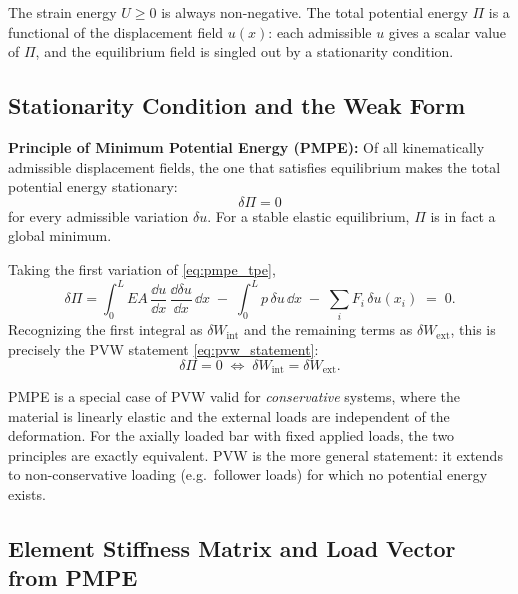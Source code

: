 \noindent
The strain energy $U \geq 0$ is always non-negative. The total potential energy
$\Pi$ is a functional of the displacement field $u(x)$: each admissible $u$
gives a scalar value of $\Pi$, and the equilibrium field is singled out by a
stationarity condition.

\subsection{Stationarity Condition and the Weak Form}
\label{sec:pmpe_stationarity}

\begin{importantbox}
\textbf{Principle of Minimum Potential Energy (PMPE):} Of all kinematically
admissible displacement fields, the one that satisfies equilibrium makes the
total potential energy stationary:
\begin{equation}
    \delta\Pi = 0
\end{equation}
for every admissible variation $\delta u$. For a stable elastic equilibrium,
$\Pi$ is in fact a global minimum.
\end{importantbox}

Taking the first variation of \cref{eq:pmpe_tpe},
\begin{equation}
    \delta\Pi
    = \int_0^L EA\,\frac{\dd u}{\dd x}\,\frac{\dd\delta u}{\dd x}\,\dd x
      \;-\;
      \int_0^L p\,\delta u\,\dd x
      \;-\;
      \sum_i F_i\,\delta u(x_i)
      \;=\; 0 .
    \label{eq:pmpe_first_variation}
\end{equation}
Recognizing the first integral as $\delta W_{\mathrm{int}}$ and the remaining
terms as $\delta W_{\mathrm{ext}}$, this is precisely the PVW statement
\cref{eq:pvw_statement}:
\begin{equation}
    \delta\Pi = 0
    \;\Longleftrightarrow\;
    \delta W_{\mathrm{int}} = \delta W_{\mathrm{ext}} .
    \label{eq:pmpe_pvw_link}
\end{equation}

\begin{remark}
PMPE is a special case of PVW valid for \emph{conservative} systems, where the
material is linearly elastic and the external loads are independent of the
deformation. For the axially loaded bar with fixed applied loads, the two
principles are exactly equivalent. PVW is the more general statement: it
extends to non-conservative loading (e.g.\ follower loads) for which no
potential energy exists.
\end{remark}

\subsection{Element Stiffness Matrix and Load Vector from PMPE}
\label{sec:pmpe_matrices}


